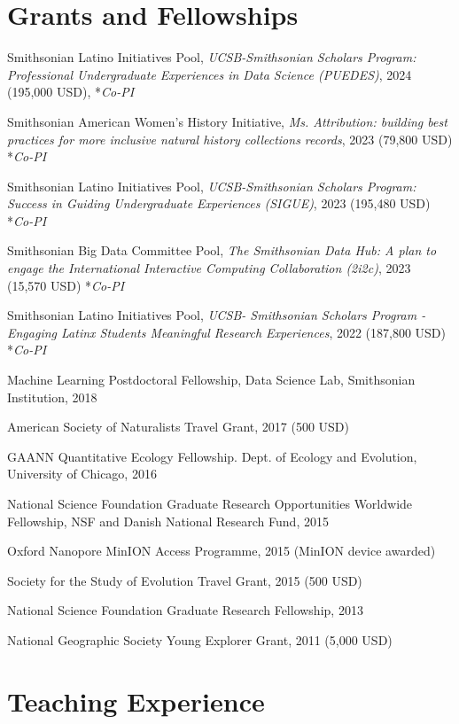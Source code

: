 \documentclass[letterpaper]{article}
\renewenvironment{itemize}{
  \begin{list}{}{
    \setlength{\leftmargin}{1.5em}
  }
}{
  \end{list}
}
\begin{document}
\section*{Grants and Fellowships}
\begin{itemize}
\item Smithsonian Latino Initiatives Pool, \textit{UCSB-Smithsonian Scholars Program: Professional Undergraduate Experiences in Data Science (PUEDES)}, 2024 (195,000 USD), *\textit{Co-PI}
\item Smithsonian American Women's History Initiative, \textit{Ms. Attribution: building best practices for more inclusive natural history collections records}, 2023 (79,800 USD) *\textit{Co-PI}
\item Smithsonian Latino Initiatives Pool, \textit{UCSB-Smithsonian Scholars Program: Success in Guiding Undergraduate Experiences (SIGUE)}, 2023 (195,480 USD) *\textit{Co-PI}
\item Smithsonian Big Data Committee Pool, \textit{The Smithsonian Data Hub: A plan to engage the International Interactive Computing Collaboration (2i2c)}, 2023 (15,570 USD) *\textit{Co-PI}
\item Smithsonian Latino Initiatives Pool, \textit{UCSB- Smithsonian Scholars Program - Engaging Latinx Students Meaningful Research Experiences}, 2022 (187,800 USD) *\textit{Co-PI}
\item Machine Learning Postdoctoral Fellowship, Data Science Lab, Smithsonian Institution, 2018
\item American Society of Naturalists Travel Grant, 2017 (500 USD)
\item GAANN Quantitative Ecology Fellowship. Dept. of Ecology and Evolution, University of Chicago, 2016
\item National Science Foundation Graduate Research Opportunities Worldwide Fellowship, NSF and Danish National Research Fund, 2015
\item Oxford Nanopore MinION Access Programme, 2015 (MinION device awarded)
\item Society for the Study of Evolution Travel Grant, 2015 (500 USD)
\item National Science Foundation Graduate Research Fellowship, 2013
\item National Geographic Society Young Explorer Grant, 2011 (5,000 USD)
\end{itemize}

\section*{Teaching Experience}
\end{document}
